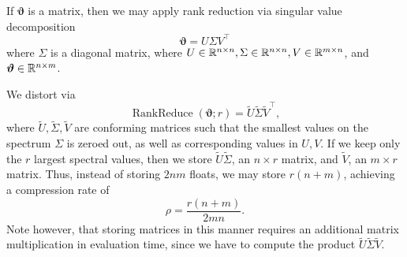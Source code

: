 \documentclass[10pt]{article}
\newcommand{\rankreduce}{\operatorname{RankReduce}}
\newcommand{\bvartheta}{{\bm{\vartheta}}}
\begin{document}
 If $\bvartheta$ is a matrix, then we may apply
rank
reduction via singular value decomposition \[
\bvartheta = U\Sigma V^\top
\]
where $\Sigma$ is a diagonal matrix, where $U \in \mathbb{R}^{n\times n}, \Sigma\in \mathbb{R}^
{n\times n}, V\in \mathbb{R}^{m\times n}$, and $\bvartheta \in \R^{n\times m}$.

We distort via \[
\rankreduce(\bvartheta; r) = \tilde U \tilde \Sigma \tilde V^\top,
\]
where $\tilde U, \tilde \Sigma, \tilde V$ are conforming matrices such that the
smallest values on the spectrum $\Sigma$ is zeroed out, as well as corresponding
values in $U,V$. If we keep only the $r$ largest spectral values, then we store
$\tilde U \tilde \Sigma$, an $n\times r$ matrix, and $\tilde V$, an $m\times r$
matrix. Thus, instead of storing $2nm$ floats, we may store $r(n+m)$, achieving
a compression rate of \[
\rho = \frac{r(n+m)}{2mn}.
\]
Note however, that storing matrices in this manner requires an additional
matrix multiplication in evaluation time, since we have to compute the product
$\tilde U \tilde \Sigma \tilde V$.






\end{document}
